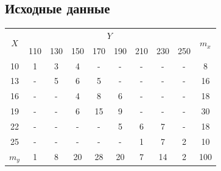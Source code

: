 \documentclass[12pt,a4paper]{report}
\begin{document}
\subsection*{Исходные данные}
\begin{tabular}{|c|cccccccc|c|}
	\hline
	\multirow{2}{*}{$X$} & \multicolumn{8}{c|}{$Y$} & \multirow{2}{*}{$m_x$}                                                                                                                                                      \\ \cline{2-9}
	                     & \multicolumn{1}{c|}{110} & \multicolumn{1}{c|}{130} & \multicolumn{1}{c|}{150} & \multicolumn{1}{c|}{170} & \multicolumn{1}{c|}{190} & \multicolumn{1}{c|}{210} & \multicolumn{1}{c|}{230} & 250 &     \\ \hline
	10                   & \multicolumn{1}{c|}{1}   & \multicolumn{1}{c|}{3}   & \multicolumn{1}{c|}{4}   & \multicolumn{1}{c|}{-}   & \multicolumn{1}{c|}{-}   & \multicolumn{1}{c|}{-}   & \multicolumn{1}{c|}{-}   & -   & 8   \\ \hline
	13                   & \multicolumn{1}{c|}{-}   & \multicolumn{1}{c|}{5}   & \multicolumn{1}{c|}{6}   & \multicolumn{1}{c|}{5}   & \multicolumn{1}{c|}{-}   & \multicolumn{1}{c|}{-}   & \multicolumn{1}{c|}{-}   & -   & 16  \\ \hline
	16                   & \multicolumn{1}{c|}{-}   & \multicolumn{1}{c|}{-}   & \multicolumn{1}{c|}{4}   & \multicolumn{1}{c|}{8}   & \multicolumn{1}{c|}{6}   & \multicolumn{1}{c|}{-}   & \multicolumn{1}{c|}{-}   & -   & 18  \\ \hline
	19                   & \multicolumn{1}{c|}{-}   & \multicolumn{1}{c|}{-}   & \multicolumn{1}{c|}{6}   & \multicolumn{1}{c|}{15}  & \multicolumn{1}{c|}{9}   & \multicolumn{1}{c|}{-}   & \multicolumn{1}{c|}{-}   & -   & 30  \\ \hline
	22                   & \multicolumn{1}{c|}{-}   & \multicolumn{1}{c|}{-}   & \multicolumn{1}{c|}{-}   & \multicolumn{1}{c|}{-}   & \multicolumn{1}{c|}{5}   & \multicolumn{1}{c|}{6}   & \multicolumn{1}{c|}{7}   & -   & 18  \\ \hline
	25                   & \multicolumn{1}{c|}{-}   & \multicolumn{1}{c|}{-}   & \multicolumn{1}{c|}{-}   & \multicolumn{1}{c|}{-}   & \multicolumn{1}{c|}{-}   & \multicolumn{1}{c|}{1}   & \multicolumn{1}{c|}{7}   & 2   & 10  \\ \hline
	$m_y$                & \multicolumn{1}{c|}{1}   & \multicolumn{1}{c|}{8}   & \multicolumn{1}{c|}{20}  & \multicolumn{1}{c|}{28}  & \multicolumn{1}{c|}{20}  & \multicolumn{1}{c|}{7}   & \multicolumn{1}{c|}{14}  & 2   & 100 \\ \hline
\end{tabular}
\end{document}
